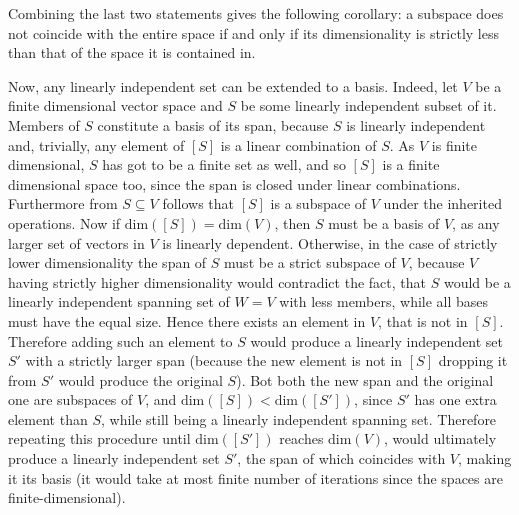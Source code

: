 \documentclass[a4paper]{article}
\newcommand{\brac}[1]{\ensuremath{\left( #1 \right)}}
\newcommand{\spn}[1]{\ensuremath{\left[ #1 \right]}}
\newcommand{\Dim}[1]{\ensuremath{\text{dim}\brac{ #1 }}}
\begin{document}
Combining the last two statements gives the following corollary: a subspace does not coincide with the entire space if and only if its dimensionality is strictly less than that of the space it is contained in.

Now, any linearly independent set can be extended to a basis. Indeed, let $V$ be a finite dimensional vector space and $S$ be some linearly independent subset of it. Members of $S$ constitute a basis of its span, because $S$ is linearly independent and, trivially, any element of $\spn{S}$ is a linear combination of $S$. As $V$ is finite dimensional, $S$ has got to be a finite set as well, and so $\spn{S}$ is a finite dimensional space too, since the span is closed under linear combinations. Furthermore from $S\subseteq V$ follows that $\spn{S}$ is a subspace of $V$ under the inherited operations. Now if $\Dim{\spn{S}} = \Dim{V}$, then $S$ must be a basis of $V$, as any larger set of vectors in $V$ is linearly dependent. Otherwise, in the case of strictly lower dimensionality the span of $S$ must be a strict subspace of $V$, because $V$ having strictly higher dimensionality would contradict the fact, that $S$ would be a linearly independent spanning set of $W=V$ with less members, while all bases must have the equal size. Hence there exists an element in $V$, that is not in $\spn{S}$. Therefore adding such an element to $S$ would produce a linearly independent set $S'$ with a strictly larger span (because the new element is not in $\spn{S}$ dropping it from $S'$ would produce the original $S$). Bot both the new span and the original one are subspaces of $V$, and $\Dim{\spn{S}} < \Dim{\spn{S'}}$, since $S'$ has one extra element than $S$, while still being a linearly independent spanning set. Therefore repeating this procedure until $\Dim{\spn{S'}}$ reaches $\Dim{V}$, would ultimately produce a linearly independent set $S'$, the span of which coincides with $V$, making it its basis (it would take at most finite number of iterations since the spaces are finite-dimensional).
\end{document}
